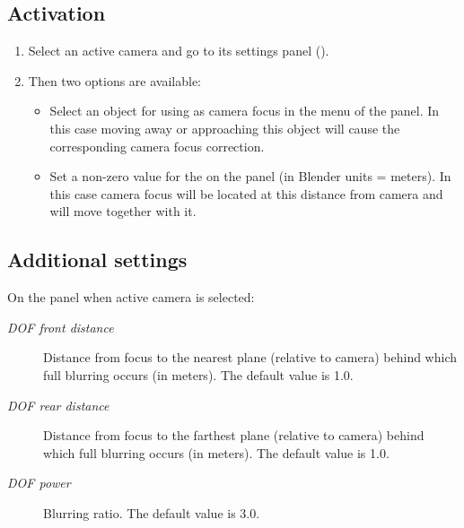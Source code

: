 \documentclass[a4paper,12pt,oneside]{sphinxmanual}
\begin{document}
\subsection{Activation}
\label{postprocessing_effects:id6}\begin{enumerate}
\item {} 
Select an active camera and go to its settings panel ().

\item {} 
Then two options are available:
\begin{itemize}
\item {} 
Select an object for using as camera focus in the  menu of the  panel. In this case moving away or approaching this object will cause the corresponding camera focus correction.

\item {} 
Set a non-zero value for the  on the  panel (in Blender units = meters). In this case camera focus will be located at this distance from camera and will move together with it.

\end{itemize}

\end{enumerate}


\subsection{Additional settings}
\label{postprocessing_effects:id7}
On the  panel when active camera is selected:
\begin{description}
\item[{\emph{DOF front distance}}] \leavevmode
Distance from focus to the nearest plane (relative to camera) behind which full blurring occurs (in meters). The default value is 1.0.

\item[{\emph{DOF rear distance}}] \leavevmode
Distance from focus to the farthest plane (relative to camera) behind which full blurring occurs (in meters). The default value is 1.0.

\item[{\emph{DOF power}}] \leavevmode
Blurring ratio. The default value is 3.0.

\end{description}
\end{document}
